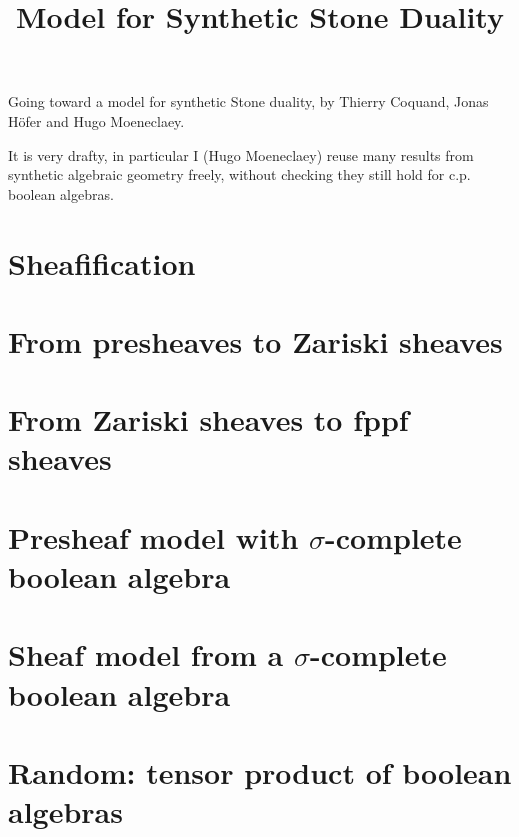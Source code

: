 \documentclass{../util/zariski}
\title{Model for Synthetic Stone Duality}
\begin{document}
\maketitle

Going toward a model for synthetic Stone duality, by Thierry Coquand, Jonas Höfer and Hugo Moeneclaey.

It is very drafty, in particular I (Hugo Moeneclaey) reuse many results from synthetic algebraic geometry freely, without checking they still hold for c.p. boolean algebras.


\tableofcontents

%

\section{Sheafification}


\section{From presheaves to Zariski sheaves}


\section{From Zariski sheaves to fppf sheaves}


\section{Presheaf model with $\sigma$-complete boolean algebra}


\section{Sheaf model from a $\sigma$-complete boolean algebra}


\section{Random: tensor product of boolean algebras}




\printindex

\printbibliography
\end{document}
